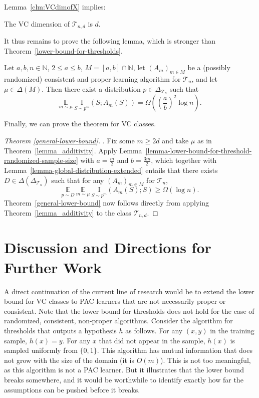 \documentclass[final,12pt]{colt2018}
\newcommand{\EE}[1]{\underset{#1}{\mathbb{E}}}
\newcommand{\mc}[1]{\mathcal{#1}}
\newcommand{\mb}{\mathbb}
\newcommand{\cT}{\mc{T}}
\newcommand{\I}[2]{\underset{#1}{\mathrm{I}}\left(#2\right)}
\newcommand{\nin}{\noindent}
\begin{document}
\nin Lemma~\ref{clm:VCdimofX} implies: 

\begin{corollary}\label{vc-dim-of-t_nd}
	The VC dimension of $\cT_{n,d}$ is $d$.
\end{corollary}



\nin It thus remains to prove the following {lemma,
which is stronger than Theorem~\ref{lower-bound-for-thresholds}.}
 
\begin{lemma}\label{lemma-lower-bound-for-threshold-randomized-sample-size}
	Let $a,b,n\in\mb{N}$, $2\leq a\leq b$, $M=[a,b] \cap \mathbb{N}$, let $\left(A_m\right)_{m\in M}$ be a (possibly randomized) consistent and proper learning algorithm for $\cT_n$, and let $\mu\in\Delta(M)$. Then there exist a distribution $p\in\Delta_{\cT_n}$ such that
	\[
	\EE{m \sim \mu} \: \I{S \sim p^m}{S;A_m(S)} = \Omega\left(\left(\frac{a}{b}\right)^2 \log n\right).
	\]
\end{lemma}

\nin Finally, we can prove the theorem for VC classes.\\

\begin{proof}[Theorem \ref{general-lower-bound}].
	{Fix some $m \geq 2d$ and take $\mu$ as in Theorem~\ref{lemma_additivity}. Apply Lemma~\ref{lemma-lower-bound-for-threshold-randomized-sample-size} with $a=\frac{m}{2}$ and $b=\frac{3m}{2}$, which together with Lemma~\ref{lemma-global-distribution-extended} entails that there exists $D \in \Delta(\Delta_{\cT_n})$ such that for any $\left(A_m\right)_{m\in M}$ for $\cT_n$,
	\[
	\EE{p \sim D} \: \EE{m \sim \mu} \: \I{S \sim p^m}{A_m(S);S} \geq  \Omega\left(\log n\right).
	\]
	Theorem~\ref{general-lower-bound} now follows directly from applying Theorem~\ref{lemma_additivity} to the class $\cT_{n,d}$.}
\end{proof}



\section{Discussion and Directions for Further Work}

A direct continuation of the current line of research would be to extend the lower bound for VC classes to PAC learners that are not necessarily proper or consistent. Note that the lower bound for thresholds does not hold for the case of randomized, consistent, non-proper algorithms. Consider the algorithm for thresholds that outputs a hypothesis $h$ as follows. For any $(x,y)$ in the training sample, $h(x)=y$. For any $x$ that did not appear in the sample, $h(x)$ is sampled uniformly from $\{0,1\}$. This algorithm has mutual information that does not grow with the size of the domain (it is $O(m)$). This is not too meaningful, as this algorithm is not a PAC learner. But it illustrates that the lower bound breaks somewhere, and it would be worthwhile to identify exactly how far the assumptions can be pushed before it breaks. 
\end{document}
